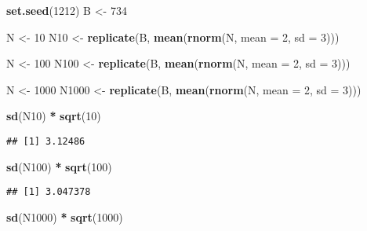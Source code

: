 \documentclass[]{article}
\newenvironment{Shaded}{\begin{snugshade}}{\end{snugshade}}
\newcommand{\DataTypeTok}[1]{\textcolor[rgb]{0.13,0.29,0.53}{#1}}
\newcommand{\DecValTok}[1]{\textcolor[rgb]{0.00,0.00,0.81}{#1}}
\newcommand{\KeywordTok}[1]{\textcolor[rgb]{0.13,0.29,0.53}{\textbf{#1}}}
\newcommand{\NormalTok}[1]{#1}
\newcommand{\OperatorTok}[1]{\textcolor[rgb]{0.81,0.36,0.00}{\textbf{#1}}}
\newcommand{\StringTok}[1]{\textcolor[rgb]{0.31,0.60,0.02}{#1}}
\begin{document}
\begin{Shaded}
\begin{Highlighting}[]
\KeywordTok{set.seed}\NormalTok{(}\DecValTok{1212}\NormalTok{)}
\NormalTok{B <-}\StringTok{ }\DecValTok{734}

\NormalTok{N <-}\StringTok{ }\DecValTok{10}
\NormalTok{N10 <-}\StringTok{ }\KeywordTok{replicate}\NormalTok{(B, }\KeywordTok{mean}\NormalTok{(}\KeywordTok{rnorm}\NormalTok{(N, }\DataTypeTok{mean =} \DecValTok{2}\NormalTok{, }\DataTypeTok{sd =} \DecValTok{3}\NormalTok{)))}

\NormalTok{N <-}\StringTok{ }\DecValTok{100}
\NormalTok{N100 <-}\StringTok{ }\KeywordTok{replicate}\NormalTok{(B, }\KeywordTok{mean}\NormalTok{(}\KeywordTok{rnorm}\NormalTok{(N, }\DataTypeTok{mean =} \DecValTok{2}\NormalTok{, }\DataTypeTok{sd =} \DecValTok{3}\NormalTok{)))}

\NormalTok{N <-}\StringTok{ }\DecValTok{1000}
\NormalTok{N1000 <-}\StringTok{ }\KeywordTok{replicate}\NormalTok{(B, }\KeywordTok{mean}\NormalTok{(}\KeywordTok{rnorm}\NormalTok{(N, }\DataTypeTok{mean =} \DecValTok{2}\NormalTok{, }\DataTypeTok{sd =} \DecValTok{3}\NormalTok{)))}

\KeywordTok{sd}\NormalTok{(N10) }\OperatorTok{*}\StringTok{ }\KeywordTok{sqrt}\NormalTok{(}\DecValTok{10}\NormalTok{)}
\end{Highlighting}
\end{Shaded}

\begin{verbatim}
## [1] 3.12486
\end{verbatim}

\begin{Shaded}
\begin{Highlighting}[]
\KeywordTok{sd}\NormalTok{(N100) }\OperatorTok{*}\StringTok{ }\KeywordTok{sqrt}\NormalTok{(}\DecValTok{100}\NormalTok{)}
\end{Highlighting}
\end{Shaded}

\begin{verbatim}
## [1] 3.047378
\end{verbatim}

\begin{Shaded}
\begin{Highlighting}[]
\KeywordTok{sd}\NormalTok{(N1000) }\OperatorTok{*}\StringTok{ }\KeywordTok{sqrt}\NormalTok{(}\DecValTok{1000}\NormalTok{)}
\end{Highlighting}
\end{Shaded}
\end{document}
